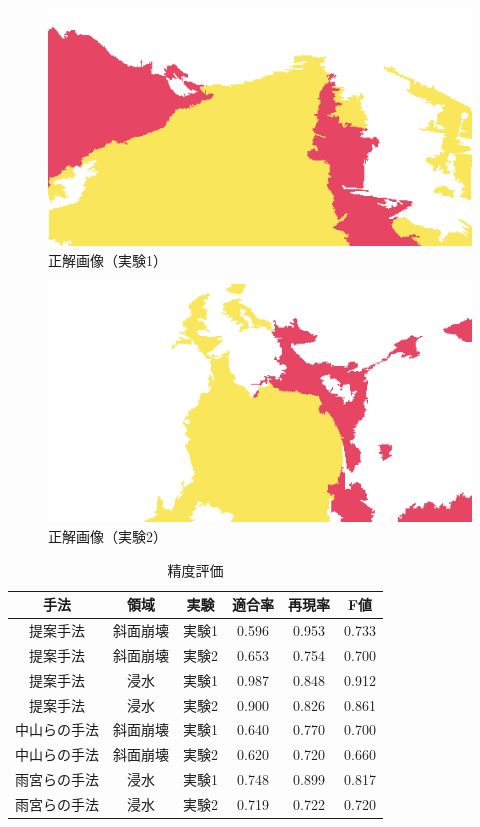 \documentclass[../Thesis]{subfiles}
\begin{document}
\begin{figure}[tbp]
	\centering
	\includegraphics[width=12cm]{img/answer1.png}
	\caption{正解画像（実験1）}
	\label{img19}
\end{figure}
\begin{figure}[tbp]
	\centering
	\includegraphics[width=12cm]{img/answer2.png}
	\caption{正解画像（実験2）}
	\label{img20}
\end{figure}

\begin{table}[tbp]
	\centering
	\caption{精度評価}
	\label{tab06}
	\begin{tabular}{c c c c c c}
		\hline
		手法 & 領域 & 実験 & 適合率 & 再現率 & F値 \\
		\hline
		\hline
		提案手法 & 斜面崩壊 & 実験1 & 0.596 & 0.953 & 0.733 \\
		提案手法 & 斜面崩壊 & 実験2 & 0.653 & 0.754 & 0.700 \\
		提案手法 & 浸水 & 実験1 & 0.987 & 0.848 & 0.912 \\
		提案手法 & 浸水 & 実験2 & 0.900 & 0.826 & 0.861 \\
		\hline
		中山らの手法 & 斜面崩壊 & 実験1 & 0.640 & 0.770 & 0.700 \\
		中山らの手法 & 斜面崩壊 & 実験2 & 0.620 & 0.720 & 0.660 \\
		雨宮らの手法 & 浸水 & 実験1 & 0.748 & 0.899 & 0.817 \\
		雨宮らの手法 & 浸水 & 実験2 & 0.719 & 0.722 & 0.720 \\
		\hline
	\end{tabular}
\end{table}
\end{document}
